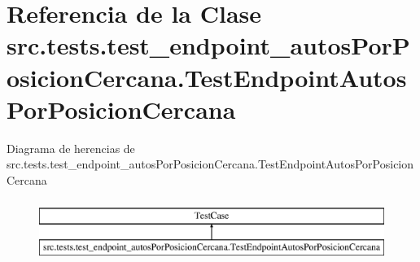 \hypertarget{classsrc_1_1tests_1_1test__endpoint__autos_por_posicion_cercana_1_1_test_endpoint_autos_por_posicion_cercana}{\section{Referencia de la Clase src.\-tests.\-test\-\_\-endpoint\-\_\-autos\-Por\-Posicion\-Cercana.\-Test\-Endpoint\-Autos\-Por\-Posicion\-Cercana}
\label{classsrc_1_1tests_1_1test__endpoint__autos_por_posicion_cercana_1_1_test_endpoint_autos_por_posicion_cercana}
}
Diagrama de herencias de src.\-tests.\-test\-\_\-endpoint\-\_\-autos\-Por\-Posicion\-Cercana.\-Test\-Endpoint\-Autos\-Por\-Posicion\-Cercana\begin{figure}[H]
\begin{center}
\leavevmode
\includegraphics[height=2.000000cm]{classsrc_1_1tests_1_1test__endpoint__autos_por_posicion_cercana_1_1_test_endpoint_autos_por_posicion_cercana}
\end{center}
\end{figure}
